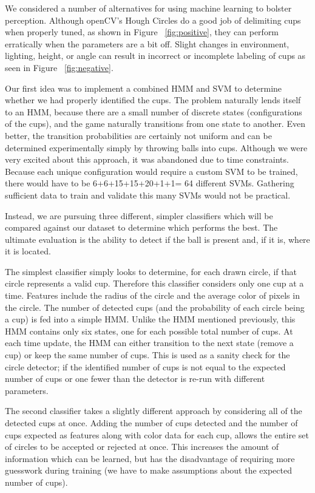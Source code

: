 \documentclass[letterpaper, 10 pt, conference]{ieeeconf}  %
\begin{document}
We considered a number of alternatives for using machine learning to bolster perception.  Although openCV’s Hough Circles do a good job of delimiting cups when properly tuned, as shown in Figure ~\ref{fig:positive}, they can perform erratically when the parameters are a bit off.  Slight changes in environment, lighting, height, or angle can result in incorrect or incomplete labeling of cups as seen in Figure ~\ref{fig:negative}.


Our first idea was to implement a combined HMM and SVM to determine whether we had properly identified the cups.  The problem naturally lends itself to an HMM, because there are a small number of discrete states (configurations of the cups), and the game naturally transitions from one state to another.  Even better, the transition probabilities are certainly not uniform and can be determined experimentally simply by throwing balls into cups.  Although we were very excited about this approach, it was abandoned due to time constraints.  Because each unique configuration would require a custom SVM to be trained, there would have to be 6+6+15+15+20+1+1= 64 different SVMs.  Gathering sufficient data to train and validate this many SVMs would not be practical.

Instead, we are pursuing three different, simpler classifiers which will be compared against our dataset to determine which performs the best.  The ultimate evaluation is the ability to detect if the ball is present and, if it is, where it is located.

The simplest classifier simply looks to determine, for each drawn circle, if that circle represents a valid cup.  Therefore this classifier considers only one cup at a time.  Features include the radius of the circle and the average color of pixels in the circle.  The number of detected cups (and the probability of each circle being a cup) is fed into a simple HMM.  Unlike the HMM mentioned previously, this HMM contains only six states, one for each possible total number of cups.  At each time update, the HMM can either transition to the next state (remove a cup) or keep the same number of cups.  This is used as a sanity check for the circle detector; if the identified number of cups is not equal to the expected number of cups or one fewer than the detector is re-run with different parameters.

The second classifier takes a slightly different approach by considering all of the detected cups at once. Adding the number of cups detected and the number of cups expected as features along with color data for each cup, allows the entire set of circles to be accepted or rejected at once.  This increases the amount of information which can be learned, but has the disadvantage of requiring more guesswork during training (we have to make assumptions about the expected number of cups).
\end{document}
